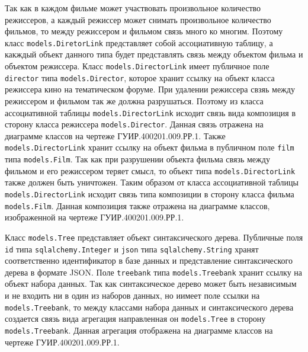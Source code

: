 Так как в каждом фильме может участвовать произвольное количество режиссеров, а каждый режиссер может снимать произвольное количество фильмов, то между режиссером и фильмом связь много ко многим. Поэтому класс \texttt{models.DiretorLink} представляет собой ассоциативную таблицу, а какждый объект данного типа будет представлять связь между объектом фильма и объектом режиссера. Класс \texttt{models.DirectorLink} имеет публичное поле \texttt{director} типа \texttt{models.Director}, которое хранит ссылку на объект класса режиссера кино на тематическом форуме. При удалении режиссера свзяь между режиссером и фильмом так же должна разрушаться. Поэтому из класса ассоциативной таблицы \texttt{models.DirectorLink} исходит связь вида композиция в сторону класса режиссера \texttt{models.Director}. Данная связь отражена на диаграмме классов на чертеже ГУИР.400201.009.РР.1. Также \texttt{models.DirectorLink} хранит ссылку на объект фильма в публичном поле \texttt{film} типа \texttt{models.Film}. Так как при разрушении объекта фильма связь между фильмом и его режиссером теряет смысл, то объект типа \texttt{models.DirectorLink} также должен быть уничтожен. Таким образом от класса ассоциативной таблицы \texttt{models.DirectorLink} исходит связь типа композиции в сторону класса фильма \texttt{models.Film}. Данная композиция также отражена на диаграмме классов, изображенной на чертеже ГУИР.400201.009.РР.1.

Класс \texttt{models.Tree} представляет объект синтаксического дерева. Публичные поля \texttt{id} типа \texttt{sqlalchemy.Integer} и \texttt{json} типа \texttt{sqlalchemy.String} хранят соответственно идентификатор в базе данных и представление синтаксического дерева в формате JSON\@. Поле \texttt{treebank} типа \texttt{models.Treebank} хранит ссылку на объект набора данных. Так как синтаксическое дерево может быть независимым и не входить ни в один из наборов данных, но иимеет поле ссылки на \texttt{models.Treebank}, то между классами набора данных и синтаксического дерева создается связь вида агрегация направленная он \texttt{models.Tree} в сторону \texttt{models.Treebank}. Данная агрегация отображена на диаграмме классов на чертеже ГУИР.400201.009.РР.1.
